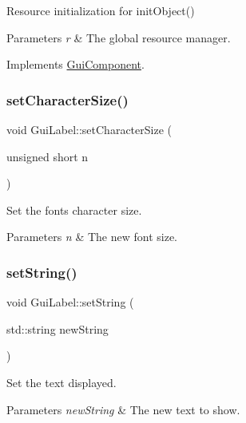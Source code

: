 Resource initialization for init\+Object() 


\begin{DoxyParams}{Parameters}
{\em r} & The global resource manager. \\
\hline
\end{DoxyParams}


Implements \mbox{\hyperlink{class_gui_component_a7c42118c5d2ba58ca02a1ea5ff81fe78}{Gui\+Component}}.

\mbox{\label{class_gui_label_ab0eaf82245f1271dd8e261fd306647b1}} 
\subsubsection{\texorpdfstring{set\+Character\+Size()}{setCharacterSize()}}
{\footnotesize\ttfamily void Gui\+Label\+::set\+Character\+Size (\begin{DoxyParamCaption}\item[{unsigned short}]{n }\end{DoxyParamCaption})}



Set the font\textquotesingle{}s character size. 


\begin{DoxyParams}{Parameters}
{\em n} & The new font size. \\
\hline
\end{DoxyParams}
\mbox{\label{class_gui_label_a40dcdb9bc406ab8ecee7e1e6df69c989}} 
\subsubsection{\texorpdfstring{set\+String()}{setString()}}
{\footnotesize\ttfamily void Gui\+Label\+::set\+String (\begin{DoxyParamCaption}\item[{std\+::string}]{new\+String }\end{DoxyParamCaption})}



Set the text displayed. 


\begin{DoxyParams}{Parameters}
{\em new\+String} & The new text to show. \\
\hline
\end{DoxyParams}
\mbox{\label{class_gui_label_ae9ba2f0ceb51fbe073ba8fc297288aff}} 
